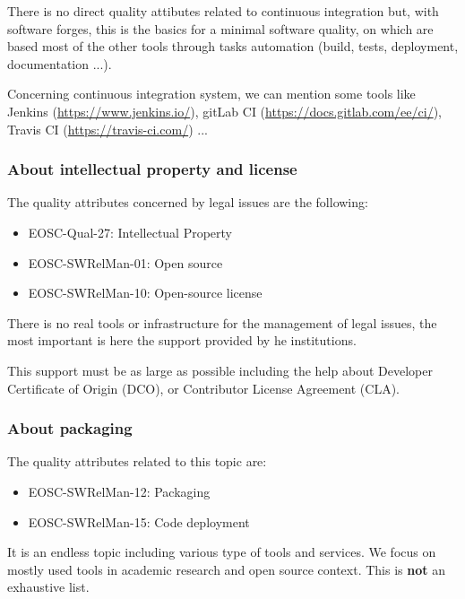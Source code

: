 There is no direct quality attibutes related to continuous integration
but, with software forges, this is the basics for a minimal software quality, on which
are based most of the other tools through tasks automation (build, tests, deployment,
documentation ...).

Concerning continuous integration system, we can mention some tools
like Jenkins (\url{https://www.jenkins.io/}), gitLab CI
(\url{https://docs.gitlab.com/ee/ci/}), Travis CI
(\url{https://travis-ci.com/}) ...

\subsubsection{About intellectual property and license}

The quality attributes concerned by legal issues are the following:
\begin{itemize}
  \item EOSC-Qual-27: Intellectual Property
  \item EOSC-SWRelMan-01: Open source
  \item EOSC-SWRelMan-10: Open-source license
\end{itemize}

There is no real tools or infrastructure for the management of legal
issues, the most important is here the support provided by he
institutions.

This support must be as large as possible including the help about
Developer Certificate of Origin (DCO), or Contributor License
Agreement (CLA).

\subsubsection{About packaging}

The quality attributes related to this topic are:
\begin{itemize}
  \item EOSC-SWRelMan-12: Packaging
  \item EOSC-SWRelMan-15: Code deployment
\end{itemize}

It is an endless topic including various type of tools and
services. We focus on mostly used tools in academic research and open
source context. This is {\bf not} an exhaustive list.

